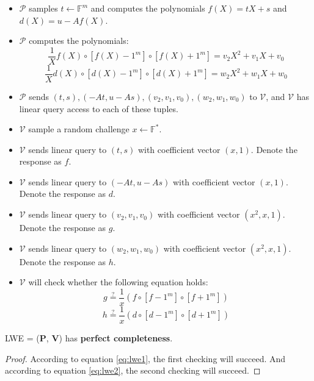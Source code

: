 \begin{itemize}
    \item $\mathcal{P}$ samples $t \leftarrow \mathbb{F}^{m}$ and computes the polynomials $f(X)=tX+s$ and $d(X)=u-Af(X)$.
    \item $\mathcal{P}$ computes the polynomials:
\begin{equation}
\label{eq:lwe1}
    \frac{1}{X} f(X) \circ [f(X) - 1^m] \circ [f(X) + 1^m] = v_2X^2 + v_1X + v_0
\end{equation}
\begin{equation}
\label{eq:lwe2}
    \frac{1}{X} d(X) \circ [d(X) - 1^m] \circ [d(X) + 1^m] = w_2X^2 + w_1X + w_0
\end{equation}

    \item $\mathcal{P}$ sends $(t, s), (-At, u-As), (v_2, v_1, v_0), (w_2, w_1, w_0)$ to $\mathcal{V}$, and $\mathcal{V}$ has linear query access to each of these tuples.
    
    \item $\mathcal{V}$ sample a random challenge $x \leftarrow \mathbb{F}^*$.
    
    \item $\mathcal{V}$ sends linear query to $(t, s)$ with coefficient vector $(x, 1)$. Denote the response as $f$.
    \item $\mathcal{V}$ sends linear query to $(-At, u-As)$ with coefficient vector $(x, 1)$. Denote the response as $d$.
    \item $\mathcal{V}$ sends linear query to $(v_2, v_1, v_0)$ with coefficient vector $(x^2, x, 1)$. Denote the response as $g$.
    \item $\mathcal{V}$ sends linear query to $(w_2, w_1, w_0)$ with coefficient vector $(x^2, x, 1)$. Denote the response as $h$.
    
    \item $\mathcal{V}$ will check whether the following equation holds:
$$
    g \overset{?}{=} \frac{1}{x} (f \circ [f - 1^m] \circ [f + 1^m])
$$
$$
    h \overset{?}{=} \frac{1}{x} (d \circ [d - 1^m] \circ [d + 1^m])
$$
\end{itemize}

\begin{lemma}
\label{lemma:szkpctcc}

LWE = ($\textbf{P}$, $\textbf{V}$) has \textbf{perfect completeness}.

\end{lemma}
\begin{proof}

According to equation \ref{eq:lwe1}, the first checking will succeed. And according to equation \ref{eq:lwe2}, the second checking will succeed.

\end{proof}

